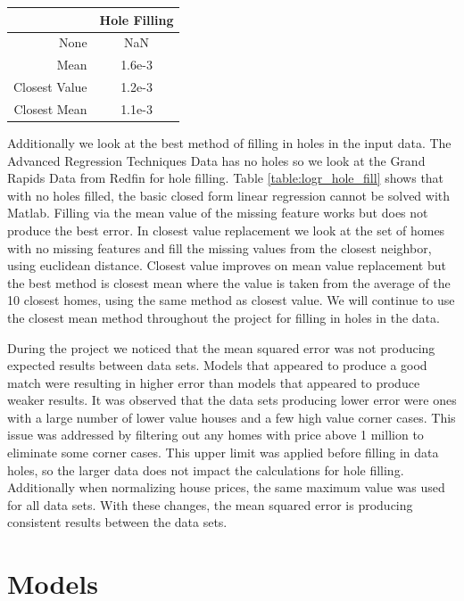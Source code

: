 \documentclass[10pt]{article}
\begin{document}
\begin{multicols}{2}
{			\begin{tabular}{r|c}
				& \small{Hole Filling} \\
				\hline
				\small{None} & \small{NaN} \\
				\hline
				\small{Mean} & \small{1.6e-3} \\
				\hline
				\small{Closest Value} & \small{1.2e-3} \\
				\hline
				\small{Closest Mean} & \small{1.1e-3} \\
				\hline
			\end{tabular}
			\label{table:linr_hole_fill}        
		\setlength{\parindent}{15pt} }
                \par
                Additionally we look at the best method of filling in holes in the input data. The Advanced Regression Techniques Data has no holes so we look at the Grand Rapids Data from Redfin for hole filling. Table \ref{table:logr_hole_fill} shows that with no holes filled, the basic closed form linear regression cannot be solved with Matlab. Filling via the mean value of the missing feature works but does not produce the best error.  In closest value replacement we look at the set of homes with no missing features and fill the missing values from the closest neighbor, using euclidean distance. Closest value improves on mean value replacement but the best method is closest mean where the value is taken from the average of the 10 closest homes, using the same method as closest value. We will continue to use the closest mean method throughout the project for filling in holes in the data.
                \par
                During the project we noticed that the mean squared error was not producing expected results between data sets. Models that appeared to produce a good match were resulting in higher error than models that appeared to produce weaker results. It was observed that the data sets producing lower error were ones with a large number of lower value houses and a few high value corner cases. This issue was addressed by filtering out any homes with price above 1 million to eliminate some corner cases. This upper limit was applied before filling in data holes, so the larger data does not impact the calculations for hole filling. Additionally when normalizing house prices, the same maximum value was used for all data sets. With these changes, the mean squared error is producing consistent results between the data sets.
 		\section{Models}

\end{multicols}
\end{document}
